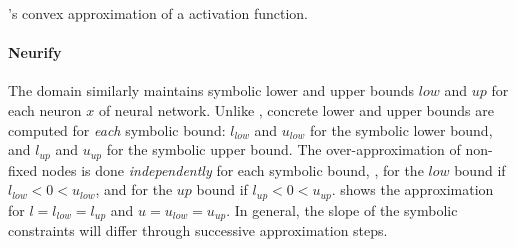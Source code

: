 \begin{marginfigure}
  \centering
  \caption{\neurify's convex approximation of a \relu{} activation function.}
\end{marginfigure}

\paragraph{Neurify}

The \neurify{} domain  similarly maintains symbolic lower and upper bounds $low$ and $up$ for each neuron $x$ of neural network. Unlike \deeppoly, concrete lower and upper bounds are computed for \emph{each} symbolic bound: $l_{low}$ and $u_{low}$ for the symbolic lower bound, and $l_{up}$ and $u_{up}$ for the symbolic upper bound.
%
The over-approximation of non-fixed \relu{} nodes is done \emph{independently} for each symbolic bound, \ie, for the $low$ bound if $l_{low} < 0 < u_{low}$, and for the $up$ bound if $l_{up} < 0 < u_{up}$.
%
 shows the approximation for $l = l_{low} = l_{up}$ and $u = u_{low} = u_{up}$. In general, the slope of the symbolic constraints will differ through successive approximation steps.

